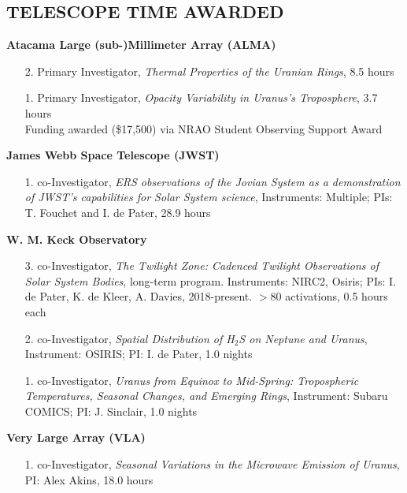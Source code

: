 \documentclass[margin, 10pt]{res} %
\begin{document}
\begin{resume}
{}{}

\section{TELESCOPE TIME AWARDED}


\textbf{Atacama Large (sub-)Millimeter Array (ALMA)} 
\begin{enumerate}
	\item[2.] Primary Investigator, {\it Thermal Properties of the Uranian Rings}, 8.5 hours %
	\item[1.] Primary Investigator, {\it Opacity Variability in Uranus's Troposphere}, 3.7 hours \\ Funding awarded (\$17,500) via NRAO Student Observing Support Award %
\end{enumerate}
\vspace{-0.3cm}
\textbf{James Webb Space Telescope (JWST)} 
\begin{enumerate}
	\item[1.] co-Investigator, {\it ERS observations of the Jovian System as a demonstration of JWST's capabilities for Solar System science}, Instruments: Multiple; PIs: T. Fouchet and I. de Pater, 28.9 hours %
\end{enumerate}
\vspace{-0.3cm}
\textbf{W. M. Keck Observatory} 
\begin{enumerate}
	\item[3.] co-Investigator, {\it The Twilight Zone: Cadenced Twilight Observations of Solar System Bodies}, long-term program. Instruments: NIRC2, Osiris; PIs: I. de Pater, K. de Kleer, A. Davies, 2018-present. $>$80 activations, 0.5 hours each %
	\item[2.] co-Investigator, {\it Spatial Distribution of H$_2$S on Neptune and Uranus}, Instrument: OSIRIS; PI: I. de Pater, 1.0 nights %
	\item[1.] co-Investigator, {\it Uranus from Equinox to Mid-Spring: Tropospheric Temperatures, Seasonal Changes, and Emerging Rings}, Instrument: Subaru COMICS; PI: J. Sinclair, 1.0 nights %
\end{enumerate}
\vspace{-0.3cm}
\textbf{Very Large Array (VLA)}
\begin{enumerate}
	\item[1.] co-Investigator, {\it Seasonal Variations in the Microwave Emission of Uranus}, PI: Alex Akins, 18.0 hours %

\end{enumerate}
\end{resume}
\end{document}
